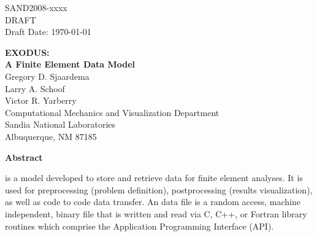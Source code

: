 \begin{titlepage}
\begin{center}
SAND2008-xxxx\\
DRAFT\\
Draft Date: \today\\
\end{center}

\vspace{1.0in}

\begin{center}
{\Huge\bf EXODUS:\\ A Finite Element Data Model\\}
\vspace{1.0in}
{\large Gregory D. Sjaardema\\
	Larry A. Schoof\\
	Victor R. Yarberry\\
	Computational Mechanics and Visualization Department\\
	Sandia National Laboratories\\
	Albuquerque, NM 87185}
\end{center}
\vspace{1.0in}
\begin{center}
\large\bf Abstract	
\end{center}

\exo{} is a model developed to store and retrieve data for finite
element analyses. It is used for preprocessing (problem definition),
postprocessing (results visualization), as well as code to code data
transfer. An \exo{} data file is a random access, machine independent,
binary file that is written and read via C, C++, or Fortran library
routines which comprise the Application Programming Interface (API).

\end{titlepage}
